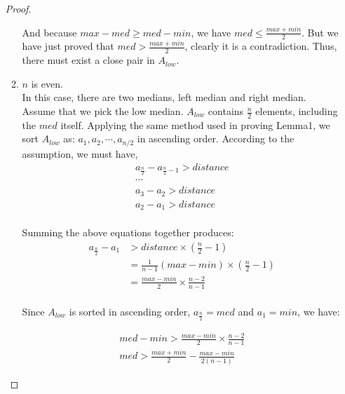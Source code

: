 \documentclass[11pt]{article}
\begin{document}
\begin{enumerate}
\begin{proof}
\begin{enumerate}
      And because $max-med \geq med-min$, we
      have $med \leq \frac{max+min}{2}$. But we have just proved that
      $med > \frac{max+min}{2}$, clearly it is a contradiction. Thus,
      there must exist a close pair in $A_{low}$.

    \item $n$ is even.\\
      In this case, there are two medians, left median and right
      median. Assume that we pick the low median.
      $A_{low}$ contains $\frac{n}{2}$ elements,
      including the $med$ itself. Applying the same method used in
      proving Lemma1, we sort $A_{low}$ as: $a_1,
      a_2, \cdots, a_{n/2}$ in ascending order. According to the
      assumption, we must have,
      \begin{equation}
        \begin{split}
          a_{\frac{n}{2}} - a_{\frac{n}{2}-1} > distance\\
          \cdots\\
          a_3 - a_2 > distance\\
          a_2 - a_1 > distance\\
        \end{split}
      \end{equation}

      Summing the above equations together produces:
      \begin{equation}
        \begin{split}
          a_{\frac{n}{2}} - a_1 &> distance \times (\frac{n}{2}-1)\\
          & = \frac{1}{n-1} (max - min) \times (\frac{n}{2}-1)\\
          & = \frac{max - min}{2} \times \frac{n-2}{n-1}\\
        \end{split}
      \end{equation}

      Since $A_{low}$ is sorted in ascending order, $a_{\frac{n}{2}}
      = med$ and $a_1 = min$, we have:

      \begin{equation}
        \begin{split}
          med - min > \frac{max - min}{2} \times \frac{n-2}{n-1}\\
          med > \frac{max+min}{2} - \frac{max-min}{2(n-1)}
        \end{split}
      \end{equation}


\end{enumerate}
\end{proof}
\end{enumerate}
\end{document}
